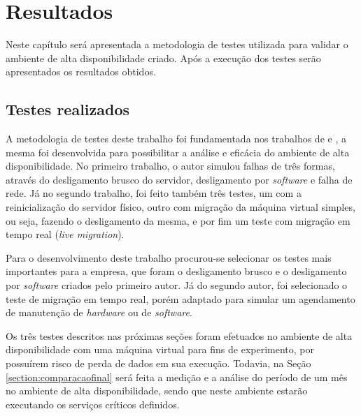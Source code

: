 \chapter{Resultados}
\label{cap:implementacaoresultados}

Neste capítulo será apresentada a metodologia de testes utilizada para validar o ambiente de alta disponibilidade criado. Após a execução
dos testes serão apresentados os resultados obtidos.


\section{Testes realizados}
\label{section:testes}

A metodologia de testes deste trabalho foi fundamentada nos trabalhos de \citet{reis2009} e \citet{goncalves2009}, a mesma foi desenvolvida para 
possibilitar a análise e eficácia do ambiente de alta disponibilidade. No primeiro trabalho, o autor simulou falhas de três formas, através
do desligamento brusco do servidor, desligamento por \textit{software} e falha de rede. Já no segundo trabalho, foi feito também três testes,
um com a reinicialização do servidor físico, outro com migração da máquina virtual simples, ou seja, fazendo o desligamento da mesma, e por fim 
um teste com migração em tempo real (\textit{live migration}).

Para o desenvolvimento deste trabalho procurou-se selecionar os testes mais importantes para a empresa, que foram o desligamento brusco e o 
desligamento por \textit{software} criados pelo primeiro autor. Já do segundo autor, foi selecionado o teste de migração em tempo real, porém 
adaptado para simular um agendamento de manutenção de \textit{hardware} ou de \textit{software}.

Os três testes descritos nas próximas seções foram efetuados no ambiente de alta disponibilidade com uma máquina virtual para fins de experimento, 
por possuírem risco de perda de dados em sua execução.
Todavia, na Seção \ref{section:comparacaofinal} será feita a medição e a análise do período de um mês no ambiente de alta disponibilidade,
sendo que neste ambiente estarão executando os serviços críticos definidos.

